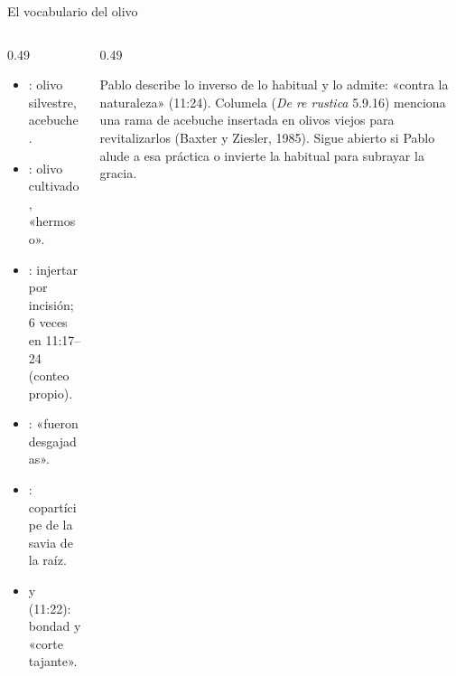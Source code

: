 \begin{frame}{El vocabulario del olivo}
\begin{columns}[T,onlytextwidth]
\begin{column}{0.49\textwidth}\small\RaggedRight
\begin{itemize}
\item {}: olivo silvestre, acebuche.
\item {}: olivo cultivado, «hermoso».
\item {}: injertar por incisión; 6 veces en 11:17--24 (conteo propio).
\item {}: «fueron desgajadas».
\item {}: copartícipe de la savia de la raíz.
\item {} y  (11:22): bondad y «corte tajante».
\end{itemize}
\end{column}
\begin{column}{0.49\textwidth}
\centering
{}\elabpropia
\begin{notalam}
Pablo describe lo inverso de lo habitual y lo admite: «contra la naturaleza» (11:24). Columela (\emph{De re rustica} 5.9.16) menciona una rama de acebuche insertada en olivos viejos para revitalizarlos (Baxter y Ziesler, 1985). Sigue abierto si Pablo alude a esa práctica o invierte la habitual para subrayar la gracia.
\end{notalam}
\end{column}
\end{columns}
\end{frame}

